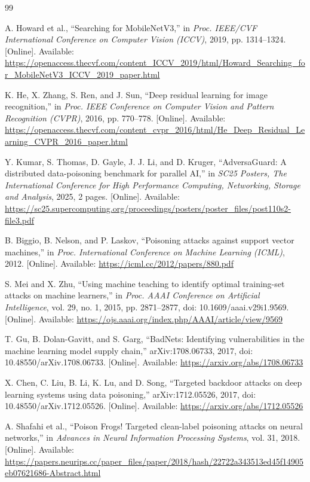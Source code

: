 \documentclass[conference]{IEEEtran}
\begin{document}
\begin{thebibliography}{99}

A. Howard et al., ``Searching for MobileNetV3,'' in \emph{Proc. IEEE/CVF International Conference on Computer Vision (ICCV)}, 2019, pp. 1314--1324. [Online]. Available: \url{https://openaccess.thecvf.com/content_ICCV_2019/html/Howard_Searching_for_MobileNetV3_ICCV_2019_paper.html}

K. He, X. Zhang, S. Ren, and J. Sun, ``Deep residual learning for image recognition,'' in \emph{Proc. IEEE Conference on Computer Vision and Pattern Recognition (CVPR)}, 2016, pp. 770--778. [Online]. Available: \url{https://openaccess.thecvf.com/content_cvpr_2016/html/He_Deep_Residual_Learning_CVPR_2016_paper.html}

Y. Kumar, S. Thomas, D. Gayle, J. J. Li, and D. Kruger, ``AdversaGuard: A distributed data-poisoning benchmark for parallel AI,'' in \emph{SC25 Posters, The International Conference for High Performance Computing, Networking, Storage and Analysis}, 2025, 2 pages. [Online]. Available: \url{https://sc25.supercomputing.org/proceedings/posters/poster_files/post110s2-file3.pdf}

B. Biggio, B. Nelson, and P. Laskov, ``Poisoning attacks against support vector machines,'' in \emph{Proc. International Conference on Machine Learning (ICML)}, 2012. [Online]. Available: \url{https://icml.cc/2012/papers/880.pdf}

S. Mei and X. Zhu, ``Using machine teaching to identify optimal training-set attacks on machine learners,'' in \emph{Proc. AAAI Conference on Artificial Intelligence}, vol. 29, no. 1, 2015, pp. 2871--2877, doi: 10.1609/aaai.v29i1.9569. [Online]. Available: \url{https://ojs.aaai.org/index.php/AAAI/article/view/9569}

T. Gu, B. Dolan-Gavitt, and S. Garg, ``BadNets: Identifying vulnerabilities in the machine learning model supply chain,'' arXiv:1708.06733, 2017, doi: 10.48550/arXiv.1708.06733. [Online]. Available: \url{https://arxiv.org/abs/1708.06733}

X. Chen, C. Liu, B. Li, K. Lu, and D. Song, ``Targeted backdoor attacks on deep learning systems using data poisoning,'' arXiv:1712.05526, 2017, doi: 10.48550/arXiv.1712.05526. [Online]. Available: \url{https://arxiv.org/abs/1712.05526}

A. Shafahi et al., ``Poison Frogs! Targeted clean-label poisoning attacks on neural networks,'' in \emph{Advances in Neural Information Processing Systems}, vol. 31, 2018. [Online]. Available: \url{https://papers.neurips.cc/paper_files/paper/2018/hash/22722a343513ed45f14905eb07621686-Abstract.html}


\end{thebibliography}
\end{document}
